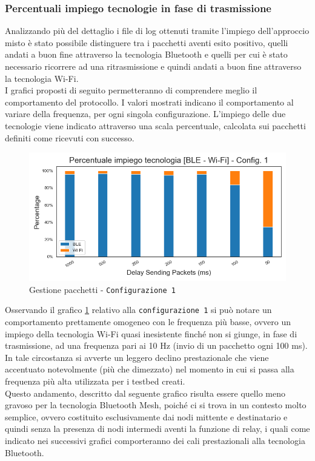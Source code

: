 \subsubsection{Percentuali impiego tecnologie in fase di trasmissione}
\noindent Analizzando più del dettaglio i file di log ottenuti tramite l'impiego dell'approccio misto è stato possibile distinguere tra i pacchetti aventi esito positivo, quelli andati a buon fine attraverso la tecnologia Bluetooth e quelli per cui è stato necessario ricorrere ad una ritrasmissione e quindi andati a buon fine attraverso la tecnologia Wi-Fi. \\
I grafici proposti di seguito permetteranno di comprendere meglio il comportamento del protocollo. I valori mostrati indicano il comportamento al variare della frequenza, per ogni singola configurazione. L'impiego delle due tecnologie viene indicato attraverso una scala percentuale, calcolata sui pacchetti definiti come ricevuti con successo.

\begin{figure}[hbt!]
    \centering
    \includegraphics[width = 1\textwidth]{images/graphs/myplot_config_1_title.png}
    \caption{Gestione pacchetti - \texttt{Configurazione 1}}
    \label{graph:mixed_conf_1}
\end{figure}

\noindent Osservando il grafico \ref{graph:mixed_conf_1} relativo alla \texttt{configurazione 1} si può notare un comportamento prettamente omogeneo con le frequenza più basse, ovvero un impiego della tecnologia Wi-Fi quasi inesistente finché non si giunge, in fase di trasmissione, ad una frequenza pari ai 10 Hz (invio di un pacchetto ogni 100 ms). In tale circostanza si avverte un leggero declino prestazionale che viene accentuato notevolmente (più che dimezzato) nel momento in cui si passa alla frequenza più alta utilizzata per i testbed creati.\\
Questo andamento, descritto dal seguente grafico risulta essere quello meno gravoso per la tecnologia Bluetooth Mesh, poiché ci si trova in un contesto molto semplice, ovvero costituito esclusivamente dai nodi mittente e destinatario e quindi senza la presenza di nodi intermedi aventi la funzione di relay, i quali come indicato nei successivi grafici comporteranno dei cali prestazionali alla tecnologia Bluetooth.

